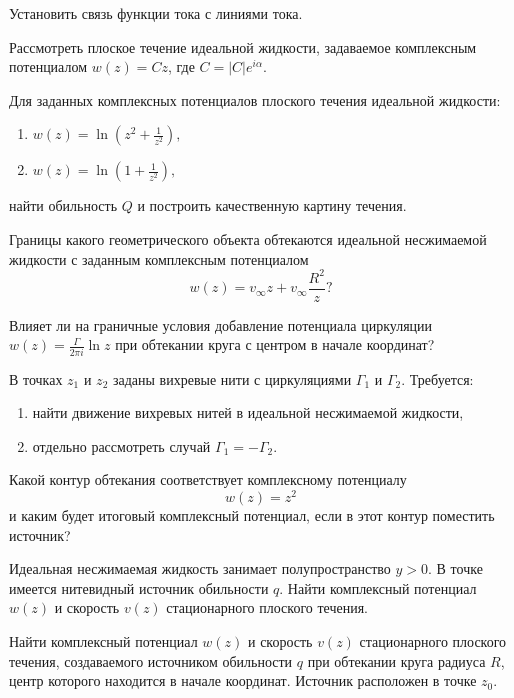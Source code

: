 \documentclass[a4paper, 14pt]{extarticle}
\begin{document}
\begin{problems}

	\item Установить связь функции тока с линиями тока.

	\item Рассмотреть плоское течение идеальной жидкости, задаваемое комплексным потенциалом $w(z) = Cz$, где $C = |C| e^{i \alpha}$.

	\item Для заданных комплексных потенциалов плоского течения идеальной жидкости:
		\begin{enumerate}
			\item 
			$
				w(z) = \ln \left( z^2 + \displaystyle\frac{1}{z^2} \right),
			$
			\item 
			$ 
			w(z) = \ln \left( 1 + \displaystyle\frac{1}{z^2} \right),
			$
		\end{enumerate}
	найти обильность $Q$ и построить качественную картину течения.
	
	\item 
	Границы какого геометрического объекта обтекаются идеальной несжимаемой жидкости с заданным комплексным потенциалом
	\[
		w(z)  = v_\infty z + v_\infty \frac{R^2}{z}?
	\]
	
	Влияет ли на граничные условия добавление потенциала циркуляции  $w(z) = \displaystyle\frac{\Gamma}{2 \pi i} \ln z$ при обтекании круга с центром в начале координат?
	
	
	\item В точках $z_1$ и $z_2$ заданы вихревые нити с циркуляциями $\Gamma_1$ и $\Gamma_2$. Требуется:
	\begin{enumerate}
		\item найти движение вихревых нитей в идеальной несжимаемой жидкости, 
		\item отдельно рассмотреть случай $\Gamma_1 = -\Gamma_2$.
	\end{enumerate}

	\item
	Какой контур обтекания соответствует комплексному потенциалу
	\[
	w(z) = z^2
	\]
	и каким будет итоговый комплексный потенциал, если в этот контур поместить источник?
	
	\item
	Идеальная несжимаемая жидкость занимает полупространство $y>0$. В точке  имеется нитевидный источник обильности $q$. Найти комплексный потенциал $w(z)$ и скорость $v(z)$ стационарного плоского течения.
	
	\item
	Найти комплексный потенциал $w(z)$ и скорость $v(z)$ стационарного плоского течения, создаваемого источником обильности $q$ при обтекании круга радиуса $R$, центр которого находится в начале координат. Источник расположен в точке $z_0$. 
	

\end{problems}
\end{document}
